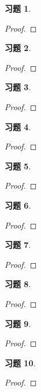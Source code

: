 \documentclass{ctexart}
\newtheorem{problem}{习题}[section]
\begin{document}
\begin{problem}
\end{problem}
\begin{proof}

\end{proof}

\begin{problem}
\end{problem}
\begin{proof}

\end{proof}

\begin{problem}
\end{problem}
\begin{proof}

\end{proof}

\setcounter{problem}{34}
\begin{problem}
\end{problem}
\begin{proof}

\end{proof}

\setcounter{problem}{36}
\begin{problem}
\end{problem}
\begin{proof}

\end{proof}

\setcounter{problem}{39}
\begin{problem}
\end{problem}
\begin{proof}

\end{proof}

\begin{problem}
\end{problem}
\begin{proof}

\end{proof}

\setcounter{problem}{43}
\begin{problem}
\end{problem}
\begin{proof}

\end{proof}

\setcounter{problem}{45}
\begin{problem}
\end{problem}
\begin{proof}

\end{proof}

\begin{problem}
\end{problem}
\begin{proof}

\end{proof}
\end{document}
